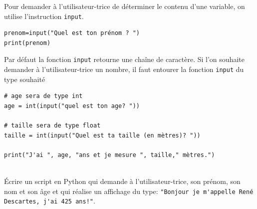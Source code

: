 \documentclass[a4paper,12pt]{article}
\begin{document}
\begin{apprendre}
	Pour demander à l’utilisateur-trice de déterminer le contenu d’une variable, on utilise l’instruction \lstinline{input}.
	\begin{lstlisting}[numbers=none]
prenom=input("Quel est ton prénom ? ")
print(prenom)
	\end{lstlisting}
	Par défaut la fonction \lstinline{input} retourne une chaîne de caractère. Si l'on souhaite demander à l'utilisateur-trice un nombre, il faut entourer la fonction \lstinline{input} du type souhaité
	\begin{lstlisting}[numbers=none]
# age sera de type int
age = int(input("quel est ton age? "))

# taille sera de type float
taille = int(input("Quel est ta taille (en mètres)? "))

print("J'ai ", age, "ans et je mesure ", taille," mètres.")
	\end{lstlisting}
\end{apprendre}

\exo{}  ~\\ 
 Écrire un script en Python qui demande à l'utilisateur-trice, son prénom, son nom et son âge et qui réalise un affichage du type: \lstinline{"Bonjour je m'appelle René Descartes, j'ai 425 ans!"}.
 \begin{correction}
 	~\\ 
 	
 \end{correction}
\finexo

\newpage
\end{document}
